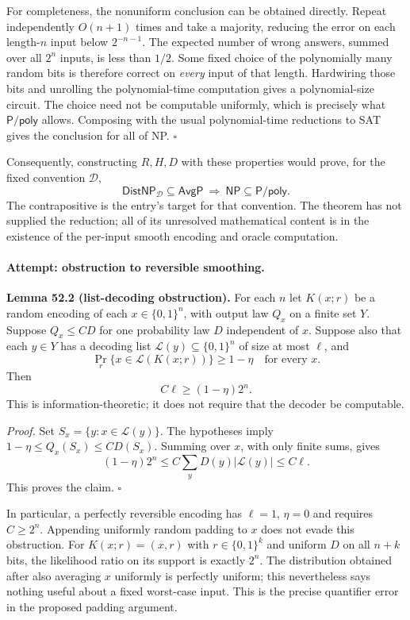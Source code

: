 \documentclass[11pt]{article}
\begin{document}
For completeness, the nonuniform conclusion can be obtained directly.
Repeat independently $O(n+1)$ times and take a majority, reducing the
error on each length-$n$ input below $2^{-n-1}$. The expected number of
wrong answers, summed over all $2^n$ inputs, is less than $1/2$. Some fixed
choice of the polynomially many random bits is therefore correct on
\emph{every} input of that length. Hardwiring those bits and unrolling the
polynomial-time computation gives a polynomial-size circuit. The choice
need not be computable uniformly, which is precisely what
$\mathsf{P/poly}$ allows. Composing with the usual polynomial-time
reductions to SAT gives the conclusion for all of NP. \hfill$\square$

Consequently, constructing $R,H,D$ with these properties would prove,
for the fixed convention $\mathcal D$,
\begin{equation}\label{ra:30006698:conditional}
 \mathsf{DistNP}_{\mathcal D}\subseteq\mathsf{AvgP}
 \ \Longrightarrow\ \mathsf{NP}\subseteq\mathsf{P/poly}.
\end{equation}
The contrapositive is the entry's target for that convention. The theorem
has not supplied the reduction; all of its unresolved mathematical content
is in the existence of the per-input smooth encoding and oracle computation.

\paragraph{Attempt: obstruction to reversible smoothing.}
\textbf{Lemma 52.2 (list-decoding obstruction).} For each $n$ let $K(x;r)$
be a random encoding of each $x\in\{0,1\}^n$, with output law $Q_x$ on a
finite set $Y$. Suppose $Q_x\le C D$ for one probability law $D$ independent
of $x$. Suppose also that each $y\in Y$ has a decoding list
$\mathcal L(y)\subseteq\{0,1\}^n$ of size at most $\ell$, and
\[
 \Pr_r\{x\in\mathcal L(K(x;r))\}\ge1-\eta
 \quad\text{for every }x.
\]
Then
\begin{equation}\label{ra:30006698:listbound}
 C\ell\ge (1-\eta)2^n.
\end{equation}
This is information-theoretic; it does not require that the decoder be
computable.

\textit{Proof.} Set $S_x=\{y:x\in\mathcal L(y)\}$. The hypotheses imply
$1-\eta\le Q_x(S_x)\le C D(S_x)$. Summing over $x$, with only finite sums,
gives
\[
 (1-\eta)2^n\le C\sum_y D(y)|\mathcal L(y)|\le C\ell.
\]
This proves the claim. \hfill$\square$

In particular, a perfectly reversible encoding has $\ell=1$, $\eta=0$
and requires $C\ge2^n$. Appending uniformly random padding to $x$ does
not evade this obstruction. For $K(x;r)=(x,r)$ with $r\in\{0,1\}^k$ and
uniform $D$ on all $n+k$ bits, the likelihood ratio on its support is
exactly $2^n$. The distribution obtained after also averaging $x$
uniformly is perfectly uniform; this nevertheless says nothing useful
about a fixed worst-case input. This is the precise quantifier error in
the proposed padding argument.
\end{document}
